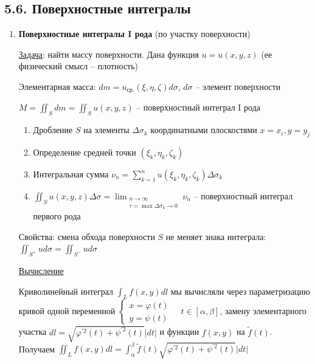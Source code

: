 \documentclass[12pt]{article}
\begin{document}
    \subsection{5.6. Поверхностные интегралы}

    \hypertarget{surfaceintegraloffirstkind}{}

    \begin{enumerate}[label*=\textbf{\arabic** }]
    \item \textbf{Поверхностные интегралы I рода} (по участку поверхности)

    \underline{Задача}: найти массу поверхности. Дана функция $u = u(x, y, z)$ (ее физический смысл -- плотность)

    Элементарная масса: $dm = u_{\text{ср.}}(\xi, \eta, \zeta) d\sigma$, $d\sigma$ -- элемент поверхности

    $M = \iint_S dm = \iint_S u(x, y, z)$ -- поверхностный интеграл I рода

    \begin{enumerate}
        \item Дробление $S$ на элементы $\Delta \sigma_k$ координатными плоскостями $x = x_i, y = y_j$

        \item Определение средней точки $(\xi_k, \eta_k, \zeta_k)$

        \item Интегральная сумма $\nu_n = \sum_{k = 1}^{n} u(\xi_k, \eta_k, \zeta_k) \Delta \sigma_k$

        \item \Defs $\iint_S u(x, y, z) \Delta \sigma = \lim_{\substack{n \to \infty \\ \tau = \max \Delta \sigma_k \to 0}} \nu_n$ -- поверхностный интеграл первого рода
    \end{enumerate}

    \hypertarget{surfaceintegraloffirstkindproperties}{}

    Свойства: смена обхода поверхности $S$ не меняет знака интеграла: $\iint_{S^+} u d\sigma = \iint_{S^-} u d\sigma$

    \mediumvspace


    \underline{Вычисление}

    \Mems Криволинейный интеграл $\int_L f(x, y) dl$ мы вычисляли через параметризацию кривой одной переменной $\begin{cases}x = \varphi(t) \\ y = \psi(t)\end{cases} \quad t \in [\alpha, \beta]$, замену элементарного участка
    $dl = \sqrt{\varphi^{\prime 2}(t) + \psi^{\prime 2}(t)} |dt|$ и функции $f(x, y)$ на $\tilde{f}(t)$. Получаем 
    $\iint_L f(x, y)dl = \int_\alpha^\beta \tilde{f}(t) \sqrt{\varphi^{\prime 2}(t) + \psi^{\prime 2}(t)} |dt|$
    

\end{enumerate}
\end{document}
